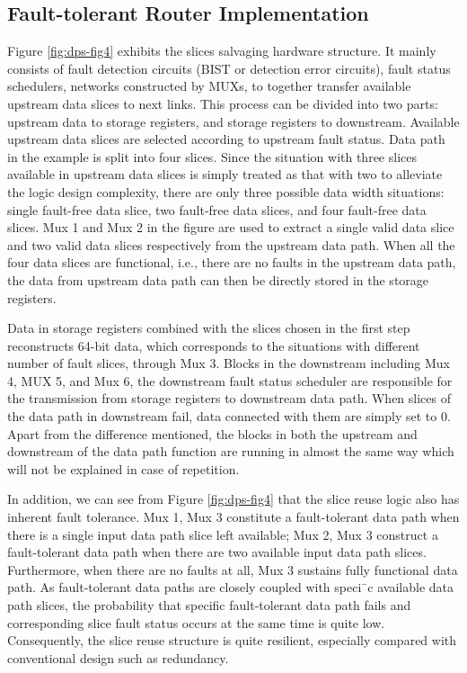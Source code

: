 \subsection{Fault-tolerant Router Implementation}
Figure \ref{fig:dps-fig4} exhibits the slices salvaging hardware structure. It mainly consists of fault detection circuits (BIST or detection error circuits), fault status schedulers, networks constructed by MUXs, to together transfer available upstream data slices to next links. This process can be divided into two parts: upstream data to storage registers, and storage registers to downstream. Available upstream data slices are selected according to upstream fault status. Data path in the example is split into four slices. Since the situation with three slices available in upstream data slices is simply treated as that with two to alleviate the logic design complexity, there are only three possible data width situations: single fault-free data slice, two fault-free data slices, and four fault-free data slices. Mux 1 and Mux 2 in the figure are used to extract a single valid data slice and two valid data slices respectively from the upstream data path. When all the four data slices are functional, i.e., there are no faults in the upstream data path, the data from upstream data path can then be directly stored in the storage registers. 

Data in storage registers combined with the slices chosen in the first step reconstructs 64-bit data, which corresponds to the situations with different number of fault slices, through Mux 3. Blocks in the downstream including Mux 4, MUX 5, and Mux 6, the downstream fault status scheduler are responsible for the transmission from storage registers to downstream data path. When slices of the data path in downstream fail, data connected with them are simply set to 0. Apart from the difference mentioned, the blocks in both the upstream and downstream of the data path function are running in almost the same way which will not be explained in case of repetition.

In addition, we can see from Figure \ref{fig:dps-fig4} that the slice reuse logic also has inherent fault tolerance. Mux 1, Mux 3 constitute a fault-tolerant data path when there is a single input data path slice left available; Mux 2, Mux 3 construct a fault-tolerant data path when there are two available input data path slices. Furthermore, when there are no faults at all, Mux 3 sustains fully functional data path. As fault-tolerant data paths are closely coupled with speci¯c available data path slices, the probability that specific fault-tolerant data path fails and corresponding slice fault status occurs at the same time is quite low. Consequently, the slice reuse structure is quite resilient, especially compared with conventional design such as redundancy.


